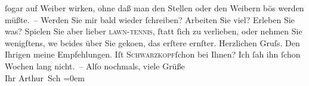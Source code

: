 \begin{ledgroupsized}[t]{13cm}
               ſogar auf Weiber wirken, ohne daß man den Stellen oder den Weibern bös werden
               müßte. – Werden Sie mir bald wieder ſchreiben? Arbeiten Sie viel? Erleben {\pb}Sie was? Spielen Sie aber lieber \textsc{lawn-tennis}, ſtatt ſich zu verlieben, oder nehmen Sie wenigſtens, we{\geminationn} beides über Sie geko{\geminationm}en,
               das erſtere ernſter.\pend
           \pstart
           Herzlichen Gruſs. Den Ihrigen meine Empfehlungen. Iſt \textsc{Schwarzkopf}ſchon bei Ihnen? Ich ſah ihn ſchon Wochen lang
               nicht. –\pend
           \pstart
           Alſo nochmals, viele Grüße{\\[\baselineskip]}Ihr \spacefill\mbox{Arthur Sch}\pend
           \leftskip=0em{}
         
         \endnumbering{}\end{ledgroupsized}  \newcommand{\dateiname}{L00025}\newcommand{\titel}{Arthur Schnitzler an Hugo von Hofmannsthal, 27. 7. 1891}\newcommand{\editorInnen}{Martin Anton Müller und Gerd-Hermann Susen}
      